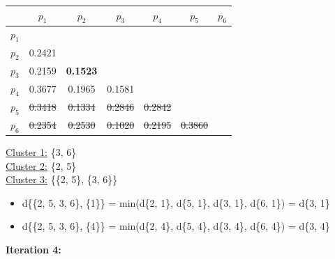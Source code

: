 \documentclass[11pt]{article}
\begin{document}
	\begin{center}
    	\begin{adjustbox}{max width=\textwidth}
		\begin{tabular}{ | c | c | c | c | c | c | c |}
	  	 	\hline

	  	 	& \textbf{$p_1$} & \textbf{$p_2$} & \textbf{$p_3$} & \textbf{$p_4$} & \textbf{$p_5$} & \textbf{$p_6$}\\
	  	 	\hline
	  	 	
	  	 	\textbf{$p_1$} &  &  &  &  &  &\\
	  	 	\hline
	  	 	
	  	 	\textbf{$p_2$} & 0.2421 &  &  &  &  &  \\
	  	 	\hline
	  	 	
	  	 	\textbf{$p_3$} & 0.2159 & \textbf{0.1523} &  &  &  & \\
	  	 	\hline
	  	 	
	  	 	\textbf{$p_4$} & 0.3677 & 0.1965 & 0.1581 &  &  & \\
	  	 	\hline
	  	 	
	  	 	\textbf{$p_5$} & \st{0.3418} & \st{0.1334} & \st{0.2846} & \st{0.2842} &  & \\
	  	 	\hline	
	  	 	
	  	 	\textbf{$p_6$} & \st{0.2354} & \st{0.2530} & \st{0.1020} & \st{0.2195} & \st{0.3860} & \\
	  	 	\hline			
    		\end{tabular}
    	\end{adjustbox}
	\end{center}
	
	\underline{Cluster 1:} \{3, 6\} \\
	\underline{Cluster 2:} \{2, 5\} \\
	\underline{Cluster 3:} \{\{2, 5\}, \{3, 6\}\} 
	
	\begin{itemize}
		\item d\{\{2, 5, 3, 6\}, \{1\}\} = min(d\{2, 1\}, d\{5, 1\}, d\{3, 1\}, d\{6, 1\}) = d\{3, 1\}
		\item d\{\{2, 5, 3, 6\}, \{4\}\} = min(d\{2, 4\}, d\{5, 4\}, d\{3, 4\}, d\{6, 4\}) = d\{3, 4\}
	\end{itemize}
	
	\textbf{Iteration 4:}
	
\end{document}
